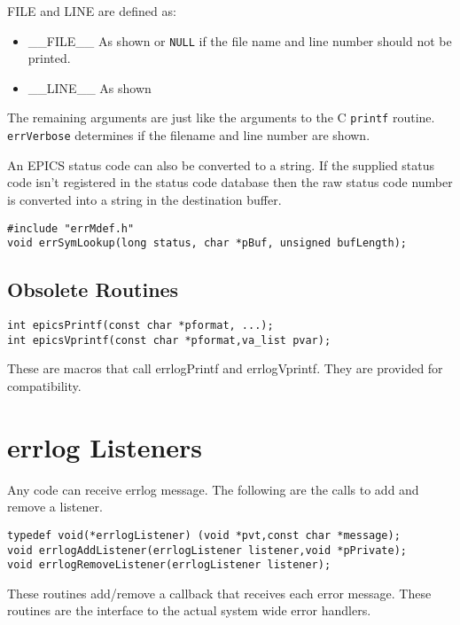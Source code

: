 FILE and LINE are defined as:

\begin{itemize}
\item \_\_FILE\_\_   As shown or \verb|NULL| if the file name and line number should not be printed.

\item \_\_LINE\_\_  As shown

\end{itemize}

The remaining arguments are just like the arguments to the C \verb|printf| routine. \verb|errVerbose| determines if the filename 
and line number are shown.

An EPICS status code can also be converted to a string. If the supplied status code isn't registered in the status code 
database then the raw status code number is converted into a string in the destination buffer.

\begin{verbatim}
#include "errMdef.h"
void errSymLookup(long status, char *pBuf, unsigned bufLength);
\end{verbatim}

\subsection{Obsolete Routines }

\begin{verbatim}
int epicsPrintf(const char *pformat, ...);
int epicsVprintf(const char *pformat,va_list pvar);
\end{verbatim}

These are macros that call errlogPrintf and errlogVprintf. They are provided for compatibility.

\section{errlog Listeners}

Any code can receive errlog message. The following are the calls to add and remove a listener.

\begin{verbatim}
typedef void(*errlogListener) (void *pvt,const char *message);
void errlogAddListener(errlogListener listener,void *pPrivate);
void errlogRemoveListener(errlogListener listener);
\end{verbatim}

These routines add/remove a callback that receives each error message. These routines are the interface to the actual 
system wide error handlers.

